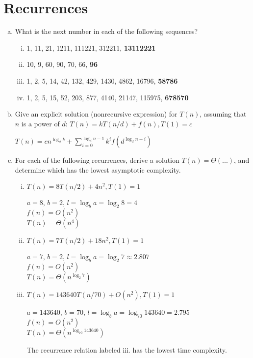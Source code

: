 \documentclass[12pt]{article}
\begin{document}
\maketitle

\section{Recurrences}\label{recurrences}

\begin{enumerate}[(a)]
\item What is the next number in each of the following sequences?
\begin{enumerate}[i.]
\item 1, 11, 21, 1211, 111221, 312211, \textbf{13112221}
\item 10, 9, 60, 90, 70, 66, \textbf{96}
\item 1, 2, 5, 14, 42, 132, 429, 1430, 4862, 16796, \textbf{58786}
\item 1, 2, 5, 15, 52, 203, 877, 4140, 21147, 115975, \textbf{678570}
\end{enumerate}

\item Give an explicit solution (nonrecursive expression) for $T(n)$, assuming that $n$ is a power of $d$:
$T(n) = kT(n/d) + f(n),  T(1) = c$
\begin{addmargin}[2em]{2em}
$T(n) = cn^{\log_{d}{k}} + \sum\limits_{i=0}^{\log_{d}{n}-1}k^if(d^{\log_{d}{n}-i})$
\end{addmargin}

\item For each of the fullowing recurrences, derive a solution $T(n) = \Theta(...)$, and determine which has the lowest asymptotic complexity.
\begin{enumerate}[i.]
\item $T(n) = 8 T(n/2) + 4n^2,  T(1) = 1$
\begin{addmargin}[2em]{2em}
$a = 8$, $b = 2$, $l = \log_{b}{a} = \log_{2}{8} = 4$ \\
$f(n) = O(n^2)$ \\
$T(n) = \Theta(n^4)$
\end{addmargin}
\item $T(n) = 7 T(n/2) + 18n^2,  T(1) = 1$
\begin{addmargin}[2em]{2em}
$a = 7$, $b = 2$, $l = \log_{b}{a} = \log_{2}{7} \approx 2.807$ \\
$f(n) = O(n^2)$ \\
$T(n) = \Theta(n^{\log_{2}{7}})$
\end{addmargin}
\item $T(n) = 143640 T(n/70) + O(n^2),  T(1) = 1$
\begin{addmargin}[2em]{2em}
$a = 143640$, $b = 70$, $l = \log_{b}{a} = \log_{70}{143640} = 2.795$ \\
$f(n) = O(n^2)$ \\
$T(n) = \Theta(n^{\log_{70}{143640}})$
\end{addmargin}
The recurrence relation labeled iii. has the lowest time complexity.
\end{enumerate}


\end{enumerate}
\end{document}
